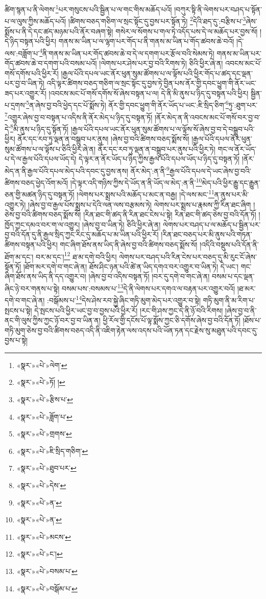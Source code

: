 ཚིག་སྙན་པ་ནི་ལེགས་\footnote{«སྣར་»«པེ་»ལེག་}པར་གསུངས་པའི་སྦྱིན་པ་ལ་གང་གིས་མཆོད་པའོ། །བཀུར་སྟི་ནི་ལེགས་པར་བཤད་པ་སྟོན་པ་ལ་ལུས་ཀྱིས་མཆོད་པའོ། །ཚིགས་བཅད་གཅིག་ལ་སྲང་སྟོང་དུ་བྱས་པར་སྟོན་ཏེ། \footnote{«སྣར་»«པེ་»ཏོ། ། }དེའི་ཐད་དུ་:བརྩིས་པ་\footnote{«སྣར་»«པེ་»རྩིས་པ་}ཞེས་སྨོས་པ་ནི་དེ་དང་ཚད་མཉམ་པའི་ནོར་བཞག་སྟེ། གསེར་ལ་སོགས་པ་གལ་ཏེ་འདོད་པས་དེ་ལ་མཆོད་པར་བྱས་སོ། །དེ་ཉིད་བསྟན་པའི་ཕྱིར། གནས་མ་ཡིན་པ་ལ་ལྷག་པར་གོད་པ་ནི་གནས་མ་ཡིན་པ་གོད་ཚབས་ཆེ་བའོ། །དེ་ལས་:བཟློག་པ་\footnote{«སྣར་»«པེ་»ཟློག་པ་}ནི་གནས་མ་ཡིན་པར་གོད་ཚབས་ཆེ་བ་དེ་ལ་དགག་པར་རྩོལ་བའི་སེམས་ཏེ། གནས་མ་ཡིན་པར་གོད་ཚབས་ཆེ་བ་དགག་པའི་བསམ་པའོ། །ལེགས་པར་ཤེས་པར་བྱ་བའི་རིགས་ཏེ། ཅིའི་ཕྱིར་ཞེ་ན། འབངས་མང་པོ་གསོ་དགོས་པའི་ཕྱིར་རོ། །རྒྱལ་པོའི་དཔལ་ཡང་ནོར་ཕུན་སུམ་ཚོགས་པ་ལ་ལྟོས་པའི་ཕྱིར་གོད་པ་ཚད་དང་ལྡན་པར་བྱ་བ་ཡིན་ཏེ། འདི་ལྟར་ཚིགས་བཅད་གཅིག་ལ་སྲང་སྟོང་དུ་བྱས་ཏེ་བྱིན་པས་ནོར་གྱི་དབང་ཕྱུག་གི་ནོར་ཡང་ཟད་པར་འགྱུར་རོ། །འབངས་མང་པོ་གསོ་དགོས་སོ་ཞེས་བསྟན་པ་ལ། དེ་ནི་མི་ནུས་པ་ཉིད་དུ་བསྟན་པའི་ཕྱིར། སྦྱིན་པ་དྲགས་\footnote{«སྣར་»«པེ་»གྲགས་}ན་ཞེས་བྱ་བའི་ཕྱེད་དང་པོ་སྨོས་ཏེ། ནོར་གྱི་དབང་ཕྱུག་གི་ནོར་ཡོད་པ་ཡང་:ཇི་སྲིད་ཅིག་\footnote{«སྣར་»«པེ་»ཇི་སྲིད་གཅིག་}ཏུ་:ཐུག་པར་\footnote{«སྣར་»«པེ་»ཐུབ་པར་}འགྱུར་ཞེས་བྱ་བ་བསྟན་པ་འདིས་ནི་ནོར་མེད་པ་ཉིད་དུ་བསྟན་ཏོ། །ནོར་མེད་ན་ནི་འབངས་མང་པོ་གསོ་བར་བྱ་བ་དེ་\footnote{«སྣར་»«པེ་»དེས་}མི་ནུས་པ་ཉིད་དུ་སྟོན་ཏོ། །རྒྱལ་པོའི་དཔལ་ཡང་ནོར་ཕུན་སུམ་ཚོགས་པ་ལ་ལྟོས་སོ་ཞེས་བྱ་བ་དེ་བསྒྲུབ་པའི་ཕྱིར། ནོར་དང་རབ་ཏུ་ལྡན་ན་བསྒྲུབ་པར་ནུས། །ཞེས་བྱ་བའི་ཚིགས་བཅད་སྨོས་སོ། །རྒྱལ་པོའི་དཔལ་ནོར་ཕུན་སུམ་ཚོགས་པ་ལ་ལྟོས་པ་ཅིའི་ཕྱིར་ཞེ་ན། ནོར་དང་རབ་ཏུ་ལྡན་ན་བསྒྲུབ་པར་ནུས་པའི་ཕྱིར་ཏེ། གང་ལ་ནོར་ཡོད་པ་དེ་ལ་རྒྱལ་པོའི་དཔལ་ཡོད་དེ། དེ་ལྟར་ན་ནོར་ཡོད་པ་ཉིད་ཀྱིས་རྒྱལ་པོའི་དཔལ་ཡོད་པ་ཉིད་དུ་བསྟན་ཏོ། །ནོར་མེད་ན་ནི་རྒྱལ་པོའི་དཔལ་མེད་པའི་དབང་དུ་བྱས་ནས། ནོར་མེད་:ན་ནི་\footnote{«སྣར་»«པེ་»ན་}རྒྱལ་པོའི་དཔལ་དེ་ཡང་ཞེས་བྱ་བའི་ཚིགས་བཅད་ཕྱེད་འོག་མའོ། །དེ་ལྟར་འདི་གཉིས་ཀྱིས་དེ་ཡོད་ན་ནི་ཡོད་ལ་མེད་:ན་ནི་\footnote{«སྣར་»«པེ་»ན་}མེད་པའི་ཕྱིར་རྒྱུ་དང་རྒྱུན་ཅན་གྱི་མཚན་ཉིད་དུ་བསྟན་ཏོ། །ལེགས་པར་སྨྲས་པའི་མཆོད་པ་མང་ན་བརྒྱ། །དེ་ལས་མང་\footnote{«སྣར་»«པེ་»མངས་}ན་ནུས་པར་མི་འགྱུར་ཏེ། །ཞེས་བྱ་བ་རྒྱལ་པོས་སྨྲས་པ་དེའི་ལན་ལས་བརྩམས་ཏེ། ལེགས་པར་སྨྲས་པ་རྣམས་ཀྱི་རིན་ཐང་ཞིག །ཅེས་བྱ་བའི་ཚིགས་བཅད་སྨོས་སོ། །རིན་ཐང་གི་ཚད་ནི་རིན་ཐང་ངེས་པ་སྟེ། རིན་ཐང་གི་ཚད་ཅེས་བྱ་བའི་དོན་ཏོ། །ཁྱོད་ཀྱང་དམའ་བར་ག་ལ་འགྱུར། །ཞེས་བྱ་བ་ཡིན་ཏེ། ཅིའི་ཕྱིར་ཞེ་ན། ལེགས་པར་བཤད་པ་ལ་མཆོད་པ་སྦྱིན་པར་བྱ་བའི་དོན་དུ་ནི་རྒྱལ་སྲིད་ཀྱང་རིང་དུ་མཆོད་པ་མ་ཡིན་པའི་ཕྱིར་རོ། །རིན་ཐང་བཅད་པར་མི་ནུས་པའི་གཏན་ཚིགས་བསྟན་པའི་ཕྱིར། གང་ཞིག་ཐོས་ནས་ཡིད་ནི་ཞེས་བྱ་བའི་ཚིགས་བཅད་སྨོས་སོ། །འདིའི་བསྡུས་པའི་དོན་ནི་ཐོག་མ་དང་། བར་མ་དང་།\footnote{«སྣར་»«པེ་»ང་།} ཐ་མ་དགེ་བའི་ཕྱིར། ལེགས་པར་བཤད་པའི་རིན་ངེས་པར་བཅད་དུ་མི་རུང་ངོ་ཞེས་སྟོན་ཏོ། །ཐོག་མར་དགེ་བ་གང་ཞེ་ན། ཐོས་ཤིང་ཉན་པའི་ཚེ་ན་ཡིད་དགའ་བར་འགྱུར་བ་ཡིན་ཏེ། དེ་ཡང་། གང་ཞིག་ཐོས་ནས་ཡིད་ནི་དད་འགྱུར་བ། །ཞེས་བྱ་བ་འདིས་བསྟན་ཏོ། །བར་དུ་དགེ་བ་གང་ཞེ་ན། བསམ་པ་དང་ལྡན་ཞིང་ཉེ་བར་གནས་པ་སྟེ། བསམ་པས་:བསམས་པ་\footnote{«སྣར་»«པེ་»བསམ་པ་}དེ་ནི་ལེགས་པར་དགའ་ལ་བརྟན་པར་འགྱུར་བའོ། །ཐ་མར་དགེ་བ་གང་ཞེ་ན། :བསྒོམས་པ་\footnote{«སྣར་»«པེ་»བསྒོམ་པ་}དེས་ཤེས་རབ་སྐྱེ་ཞིང་གཏི་མུག་མེད་པར་འགྱུར་བ་སྟེ། གཏི་མུག་ནི་མ་རིག་པ་སྤངས་པ་སྟེ། དེ་སྤངས་པའི་ཕྱིར་ཡང་བྱ་བ་བྱས་པའི་ཕྱིར་རོ། །རང་གི་ཤས་ཀྱང་དེ་ནི་ཉོ་བའི་རིགས། །ཞེས་བྱ་བ་ནི་ནང་གི་ལུས་ཀྱིས་ཀྱང་ཉོ་བར་བྱ་བ་ཡིན་ན། ཕྱི་རོལ་གྱི་དངོས་པོ་ལྟ་སྨོས་ཀྱང་ཅི་དགོས་ཞེས་བྱ་བའི་དོན་ཏོ། །ཐོས་པ་གཏི་མུག་ཅེས་བྱ་བའི་ཚིགས་བཅད་འདི་ནི་འཇིག་རྟེན་ལས་འདས་པའི་ཡོན་ཏན་དང་རྗེས་སུ་མཐུན་པའི་དབང་དུ་བྱས་པ་སྟེ། 